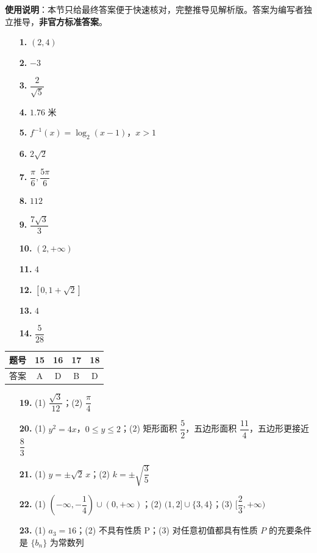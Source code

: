 
\begin{gknotice}
\textbf{使用说明}：本节只给最终答案便于快速核对，完整推导见解析版。答案为编写者独立推导，\textbf{非官方标准答案}。
\end{gknotice}

\begin{itemize}[leftmargin=2.6em]
  \item[\textbf{1.}] \((2,4)\)
  \item[\textbf{2.}] \(-3\)
  \item[\textbf{3.}] \(\dfrac{2}{\sqrt5}\)
  \item[\textbf{4.}] \(1.76\) 米
  \item[\textbf{5.}] \(f^{-1}(x)=\log_2(x-1)\)，\(x>1\)
  \item[\textbf{6.}] \(2\sqrt2\)
  \item[\textbf{7.}] \(\dfrac{\pi}{6},\dfrac{5\pi}{6}\)
  \item[\textbf{8.}] \(112\)
  \item[\textbf{9.}] \(\dfrac{7\sqrt3}{3}\)
  \item[\textbf{10.}] \((2,+\infty)\)
  \item[\textbf{11.}] \(4\)
  \item[\textbf{12.}] \([0,1+\sqrt2]\)
  \item[\textbf{13.}] \(4\)
  \item[\textbf{14.}] \(\dfrac{5}{28}\)
\end{itemize}

\begin{center}\begin{tabular}{ccccc}
\toprule
题号 & 15 & 16 & 17 & 18 \\
\midrule
答案 & A & D & B & D \\
\bottomrule
\end{tabular}\end{center}

\begin{itemize}[leftmargin=2.6em]
  \item[\textbf{19.}] (1) \(\dfrac{\sqrt3}{12}\)；(2) \(\dfrac{\pi}{4}\)
  \item[\textbf{20.}] (1) \(y^2=4x\)，\(0\le y\le2\)；(2) 矩形面积 \(\dfrac52\)，五边形面积 \(\dfrac{11}{4}\)，五边形更接近 \(\dfrac83\)
  \item[\textbf{21.}] (1) \(y=\pm\sqrt2\,x\)；(2) \(k=\pm\sqrt{\dfrac35}\)
  \item[\textbf{22.}] (1) \((-\infty,-\dfrac14)\cup(0,+\infty)\)；(2) \((1,2]\cup\{3,4\}\)；(3) \([\dfrac23,+\infty)\)
  \item[\textbf{23.}] (1) \(a_3=16\)；(2) 不具有性质 P；(3) 对任意初值都具有性质 \(P\) 的充要条件是 \(\{b_n\}\) 为常数列
\end{itemize}
